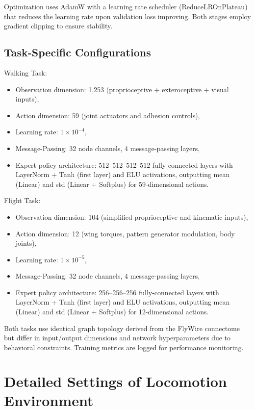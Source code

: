 \documentclass{article}
\theoremstyle{plain}
\theoremstyle{definition}
\theoremstyle{remark}
\begin{document}
Optimization uses AdamW with a learning rate scheduler (ReduceLROnPlateau) that reduces the learning rate upon validation loss improving. Both stages employ gradient clipping to ensure stability.

\subsection{Task-Specific Configurations}
Walking Task:
\begin{itemize}
\setlength{\itemsep}{0pt}
\setlength{\parsep}{0pt}
\setlength{\parskip}{0pt}
    \item Observation dimension: 1,253 (proprioceptive + exteroceptive + visual inputs),
    \item Action dimension: 59 (joint actuators and adhesion controls),  
    \item Learning rate: $1 \times 10^{-4}$,  
    \item Message-Passing: 32 node channels, 4 message-passing layers,
    \item Expert policy architecture: 512–512–512–512 fully-connected layers with LayerNorm + Tanh (first layer) and ELU activations, outputting mean (Linear) and std (Linear + Softplus) for 59-dimensional actions.
\end{itemize}

Flight Task:
\begin{itemize}
\setlength{\itemsep}{0pt}
\setlength{\parsep}{0pt}
\setlength{\parskip}{0pt}
    \item Observation dimension: 104 (simplified proprioceptive and kinematic inputs), 
    \item Action dimension: 12 (wing torques, pattern generator modulation, body joints), 
    \item Learning rate: $1 \times 10^{-5}$,
    \item Message-Passing: 32 node channels, 4 message-passing layers,  
    \item Expert policy architecture:  256–256–256 fully-connected layers with LayerNorm + Tanh (first layer) and ELU activations, outputting mean (Linear) and std (Linear + Softplus) for 12-dimensional actions.
\end{itemize}

Both tasks use identical graph topology derived from the FlyWire connectome but differ in input/output dimensions and network hyperparameters due to behavioral constraints. Training metrics are logged for performance monitoring.

\section{Detailed Settings of Locomotion Environment}
\label{app:env_details}
\end{document}
